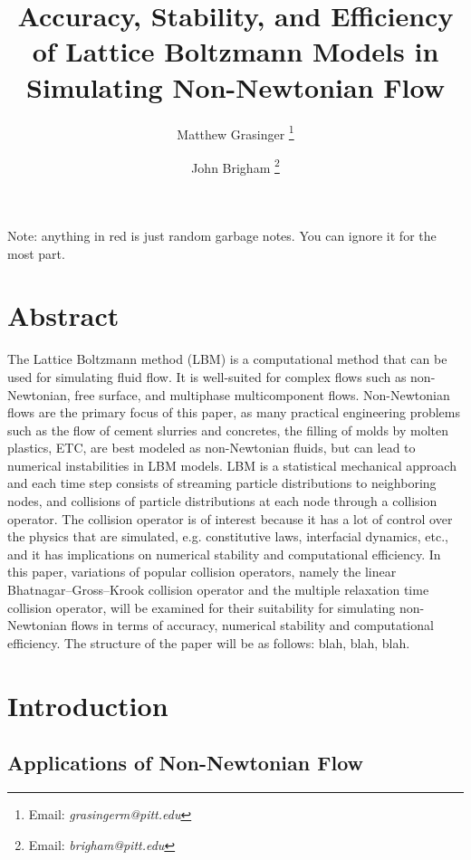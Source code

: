 \documentclass{article}
\title{Accuracy, Stability, and Efficiency of Lattice Boltzmann Models in Simulating Non-Newtonian Flow}
\author{{Matthew Grasinger}
\thanks{Email: \textit{grasingerm@pitt.edu}}}
\author{John Brigham
\thanks{Email: \textit{brigham@pitt.edu}}}
\affil{Civil and Environmental Engineering Department, University of Pittsburgh}
\begin{document}
\maketitle
\newpage
\tableofcontents
\newpage
{}

\linenumbers

Note: anything in {\color{red}red} is just random garbage notes.
You can ignore it for the most part.

\section*{Abstract}

The Lattice Boltzmann method (LBM) is a computational method that can be used for simulating fluid flow.
It is well-suited for complex flows such as non-Newtonian, free surface, and multiphase multicomponent flows.
Non-Newtonian flows are the primary focus of this paper, as many practical engineering problems such as the flow of cement slurries and concretes, the filling of molds by molten plastics, ETC, are best modeled as non-Newtonian fluids, but can lead to numerical instabilities in LBM models.
LBM is a statistical mechanical approach and each time step consists of streaming particle distributions to neighboring nodes, and collisions of particle distributions at each node through a collision operator.
The collision operator is of interest because it has a lot of control over the physics that are simulated, e.g. constitutive laws, interfacial dynamics, etc., and it has implications on numerical stability and computational efficiency.
In this paper, variations of popular collision operators, namely the linear Bhatnagar--Gross--Krook collision operator and the multiple relaxation time collision operator, will be examined for their suitability for simulating non-Newtonian flows in terms of accuracy, numerical stability and computational efficiency.
The structure of the paper will be as follows: blah, blah, blah.

\section{Introduction} %

\subsection{Applications of Non-Newtonian Flow}
\end{document}
